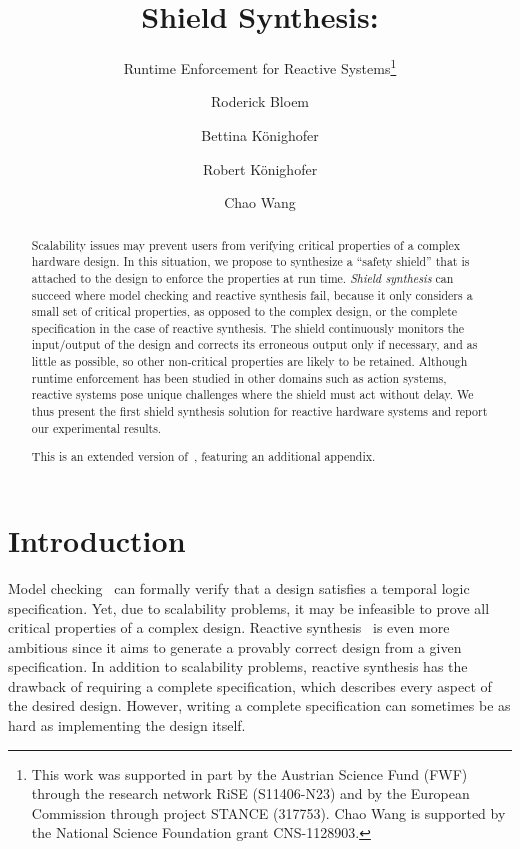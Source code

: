 \documentclass{llncs}
\newif \ifextended
\begin{document}
\extendedtrue
\frontmatter          \pagestyle{plain}
\mainmatter              \title{Shield Synthesis:}
\subtitle{Runtime Enforcement for Reactive Systems\thanks{This work was supported in part by the Austrian Science Fund
  (FWF) through the research network RiSE (S11406-N23) and by the
  European Commission through project STANCE (317753). Chao Wang is
  supported by the National Science Foundation grant CNS-1128903.}}
  \author{Roderick Bloem \and
        Bettina K\"onighofer \and
        Robert K\"onighofer \and
        Chao Wang}
 

\maketitle              


\begin{abstract}
Scalability issues may prevent users from verifying critical properties 
of a complex hardware design.  In this situation, we propose to 
synthesize a ``safety shield'' that is attached to the design to enforce 
the properties at run time.  \emph{Shield synthesis} can succeed where 
model checking and reactive synthesis fail, because it only considers a 
small set of critical properties, as opposed to the complex design, or 
the complete specification in the case of reactive synthesis. The shield 
continuously monitors the input/output of the design and corrects its 
erroneous output only if necessary, and as little as possible, so other 
non-critical properties are likely to be retained.  Although runtime 
enforcement has been studied in other domains such as action systems, 
reactive systems pose unique challenges where the shield must act 
without delay.  We thus present the first shield synthesis solution for 
reactive hardware systems and report our experimental results.
\ifextended
This is an extended version of~\cite{conference}, featuring an 
additional appendix.
\fi
\end{abstract}

\section{Introduction}

Model checking~\cite{Clarke81,Quiell81} can formally verify that a 
design satisfies a temporal logic specification.  Yet, due to 
scalability problems, it may be infeasible to prove all critical 
properties of a complex design.  Reactive 
synthesis~\cite{Pnueli89,BloemJPPS12} is even more ambitious since it 
aims to generate a provably correct design from a given specification. 
In addition to scalability problems, reactive synthesis has the drawback 
of requiring a complete specification, which describes every aspect of 
the desired design.  However, writing a complete specification can 
sometimes be as hard as implementing the design itself.
\end{document}
